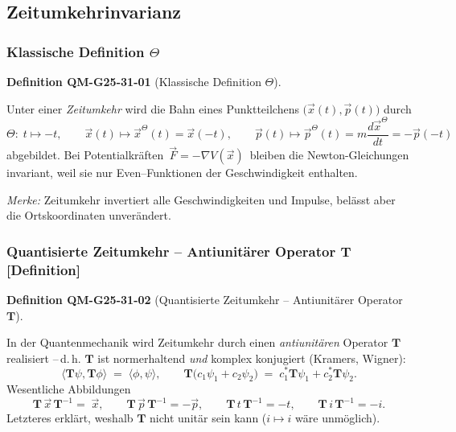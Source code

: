 \documentclass[10pt, letterpaper]{article}
\newcommand{\CustomHeading}[3]{%
  \par\medskip\noindent%
  \textbf{#1 #2} \textnormal{(#3)}.\enskip%
}
\newenvironment{DEF}[2]{\begin{unitbox}\CustomHeading{Definition}{#1}{#2}}{\end{unitbox}}
\begin{document}

\subsection{Zeitumkehrinvarianz}

\subsubsection*{Klassische Definition $\Theta$}


\begin{DEF}{QM-G25-31-01}{Klassische Definition $\Theta$}
Unter einer \emph{Zeitumkehr} wird die Bahn eines Punktteilchens
\(
  \bigl(\vec x(t),\vec p(t)\bigr)
\)
durch
\[
  \Theta:\;
  t\mapsto -t,\qquad
  \vec x(t)\mapsto\vec x^\Theta(t)=\vec x(-t),\qquad
  \vec p(t)\mapsto\vec p^\Theta(t)=m\frac{d\vec x^\Theta}{dt}=-\vec p(-t)
\]
abgebildet.
Bei Potentialkräften $\,\vec F=-\nabla V(\vec x)\,$ bleiben die
Newton-Gleichungen invariant, weil sie nur Even–Funktionen der
Geschwindigkeit enthalten.\par
\vspace{0.3em}
\emph{Merke:}  Zeitumkehr invertiert alle Geschwindigkeiten und Impulse,
belässt aber die Ortskoordinaten unverändert.
\end{DEF}


\subsubsection*{Quantisierte Zeitumkehr – Antiunitärer Operator $\mathbf T$ [Definition]}


\begin{DEF}{QM-G25-31-02}{Quantisierte Zeitumkehr – Antiunitärer Operator $\mathbf T$}
In der Quantenmechanik wird Zeitumkehr durch einen
\emph{antiunitären} Operator $\mathbf T$ realisiert –\,d.\,h.
$\mathbf T$ ist normerhaltend \emph{und} komplex konjugiert
(Kramers, Wigner):
\[
  \bigl\langle\mathbf T\psi,\mathbf T\phi\bigr\rangle
  \;=\;\langle\phi,\psi\rangle,\qquad
  \mathbf T\bigl(c_1\psi_1+c_2\psi_2\bigr)
  \;=\;c_1^{\!*}\mathbf T\psi_1+c_2^{\!*}\mathbf T\psi_2 .
\]
Wesentliche Abbildungen
\[
  \mathbf T\,\vec x\,\mathbf T^{-1}= \; \vec x, \qquad
  \mathbf T\,\vec p\,\mathbf T^{-1}= -\vec p, \qquad
  \mathbf T\,t\,\mathbf T^{-1}= -t, \qquad
  \mathbf T\,i\,\mathbf T^{-1}= -i .
\]
Letzteres erklärt, weshalb $\mathbf T$ nicht unitär sein kann
($i\mapsto i$ wäre unmöglich).
\end{DEF}
\end{document}
